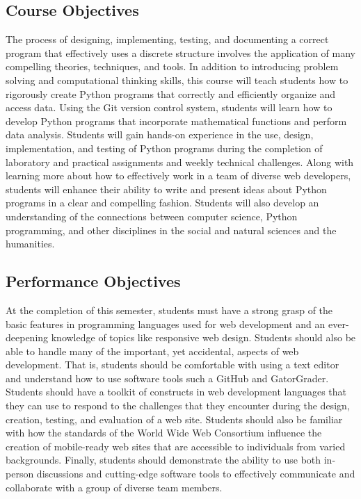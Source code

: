 \documentclass[11pt]{article}
\begin{document}
\subsection*{Course Objectives}

The process of designing, implementing, testing, and documenting a correct
program that effectively uses a discrete structure involves the application of
many compelling theories, techniques, and tools. In addition to introducing
problem solving and computational thinking skills, this course will teach
students how to rigorously create Python programs that correctly and
efficiently organize and access data. Using the Git version control system,
students will learn how to develop Python programs that incorporate
mathematical functions and perform data analysis.
%
Students will gain hands-on experience in the use, design, implementation, and
testing of Python programs during the completion of laboratory and practical
assignments and weekly technical challenges. Along with learning more about how
to effectively work in a team of diverse web developers, students will enhance
their ability to write and present ideas about Python programs in a clear and
compelling fashion. Students will also develop an understanding of the
connections between computer science, Python programming, and other disciplines
in the social and natural sciences and the humanities.

\subsection*{Performance Objectives}

At the completion of this semester, students must have a strong grasp of the
basic features in programming languages used for web development and an
ever-deepening knowledge of topics like responsive web design. Students should
also be able to handle many of the important, yet accidental, aspects of web
development. That is, students should be comfortable with using a text editor
and understand how to use software tools such a GitHub and GatorGrader.
Students should have a toolkit of constructs in web development languages that
they can use to respond to the challenges that they encounter during the
design, creation, testing, and evaluation of a web site. Students should also
be familiar with how the standards of the World Wide Web Consortium influence
the creation of mobile-ready web sites that are accessible to individuals from
varied backgrounds. Finally, students should demonstrate the ability to use
both in-person discussions and cutting-edge software tools to effectively
communicate and collaborate with a group of diverse team members.
\end{document}
